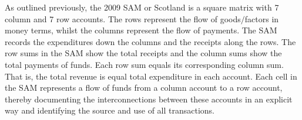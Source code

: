 \bigskip

As outlined previously, the 2009 SAM or Scotland is a square matrix with 7 column and 7 row accounts. The rows represent the flow of goods$/$factors in money terms, whilst the columns represent the flow of payments. The SAM records the expenditures down the columns and the receipts along the rows. The row sums in the SAM show the total receipts and the column sums show the total payments of funds. Each row sum equals its corresponding column sum. That is, the total revenue is equal total expenditure in each account. Each cell in the SAM represents a flow of funds from a column account to a row account, thereby documenting the interconnections between these accounts in an explicit way and identifying the source and use of all transactions.

\bigskip

